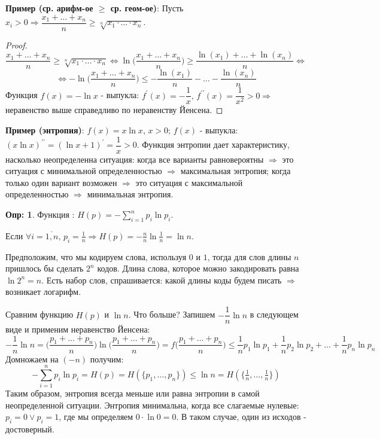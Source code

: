 \documentclass[12pt]{article}
\theoremstyle{definition}
\newtheorem{defn}{Опр:}
\begin{document}
\textbf{Пример (ср. арифм-ое $\geq$ ср. геом-ое)}: Пусть $x_i > 0 \Rightarrow \dfrac{x_1 + \dotsc + x_n}{n} \geq \sqrt[n]{x_1{\cdot}\dotsc{\cdot}x_n}$.
\begin{proof}
	$$\dfrac{x_1 + \dotsc + x_n}{n} \geq \sqrt[n]{x_1{\cdot}\dotsc{\cdot}x_n} \Leftrightarrow \ln\Big(\dfrac{x_1 + \dotsc + x_n}{n} \Big) \geq \dfrac{\ln(x_1) + \dotsc + \ln(x_n)}{n} \Leftrightarrow$$
	$$\Leftrightarrow  -\ln\Big(\dfrac{x_1 + \dotsc + x_n}{n} \Big) \leq -\dfrac{\ln(x_1)}{n} - \dotsc - \dfrac{\ln(x_n)}{n}$$
	Функция $f(x) = -\ln{x}$ - выпукла: $f^\prime(x) = 	- \dfrac{1}{x}, \, f^{\prime\prime}(x) = \dfrac{1}{x^2} > 0 \Rightarrow$ неравенство выше справедливо по неравенству Йенсена.
\end{proof}

\textbf{Пример (энтропия)}: $f(x) = x\ln{x},\, x > 0$; $f(x)$ - выпукла: $(x\ln{x})^{\prime\prime} = (\ln{x} + 1)^\prime = \dfrac{1}{x} > 0$. Функция энтропии дает характеристику, насколько неопределенна ситуация: когда все варианты равновероятны $\Rightarrow$ это ситуация с минимальной определенностью $\Rightarrow$ максимальная энтропия; когда только один вариант возможен $\Rightarrow$ это ситуация с максимальной определенностью $\Rightarrow$ минимальная энтропия.
\begin{defn}
	Функция : $H(p) = -\displaystyle \sum\limits_{i = 1}^{n} p_i \ln{p_i}$.
\end{defn}
Если $\forall i =\overline{1,n},\, p_i = \frac{1}{n} \Rightarrow H(p) = -\frac{n}{n}\ln{\frac{1}{n}} = \ln{n}$. 

Предположим, что мы кодируем слова, используя $0$ и $1$, тогда для слов длины $n$ пришлось бы сделать $2^n$ кодов. Длина слова, которое можно закодировать равна $\ln{2^n} = n$. Есть набор слов, спрашивается: какой длины коды будем писать $\Rightarrow$ возникает логарифм.

Сравним функцию $H(p)$ и $\ln{n}$. Что больше? Запишем $-\dfrac{1}{n}\ln{n}$ в следующем виде и применим неравенство Йенсена:
$$
-\dfrac{1}{n}\ln{n} = \Big(\dfrac{p_1 + \dotsc + p_n}{n}\Big)\ln{\Big( \dfrac{p_1 + \dotsc + p_n}{n}\Big)} = f\Big(\dfrac{p_1 + \dotsc + p_n}{n} \Big) \leq \dfrac{1}{n}p_1 \ln{p_1} + \dfrac{1}{n}p_2\ln{p_2} + \dotsc + \dfrac{1}{n}p_n\ln{p_n}
$$
Домножаем на $(-n)$ получим:
$$
- \sum\limits_{i=1}^{n} p_i\ln{p_i} = H(p) = H(\{p_1, \dotsc, p_n \}) \leq \ln{n} = H(\{\tfrac{1}{n},\dotsc,\tfrac{1}{n} \})
$$
Таким образом, энтропия всегда меньше или равна энтропии в самой неопределенной ситуации. 
Энтропия минимальна, когда все слагаемые нулевые: $p_i =0 \vee p_i = 1$, где мы определяем $0{\cdot}\!\ln{0} = 0$. В таком случае, один из исходов - достоверный.
\end{document}
